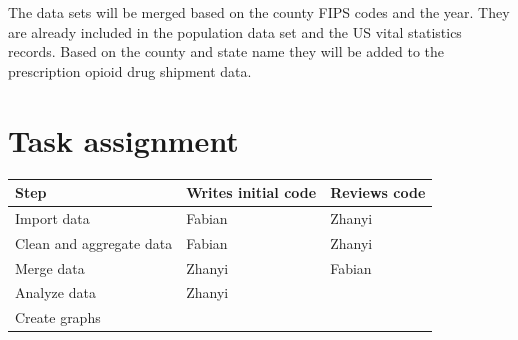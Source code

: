 \documentclass[12pt]{article}
\begin{document}
The data sets will be merged based on the county FIPS codes and the year. They are already included in the population data set and the US vital statistics records. Based on the county and state name they will be added to the prescription opioid drug shipment data.
\vspace*{1cm}


\section{Task assignment}

\begin{center}
\begin{tabular}{ l | l l}
\textbf{Step}  & \textbf{Writes initial code} & \textbf{Reviews code}\\ \hline
 Import data & Fabian & Zhanyi\\  
 Clean and aggregate data & Fabian & Zhanyi\\
 Merge data & Zhanyi & Fabian \\
 Analyze data & Zhanyi & \\
 Create graphs & & \\
\end{tabular}
\end{center}
\end{document}
